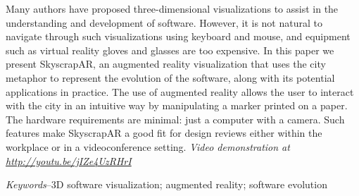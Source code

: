 Many authors have proposed three-dimensional visualizations to assist in the understanding and development of software. However, it is not natural to navigate through such visualizations using keyboard and mouse, and equipment such as virtual reality gloves and glasses are too expensive. In this paper we present SkyscrapAR, an augmented reality visualization that uses the city metaphor to represent the evolution of the software, along with its potential applications in practice. The use of augmented reality allows the user to interact with the city in an intuitive way by manipulating a marker printed on a paper. The hardware requirements are minimal: just a computer with a camera. Such features make SkyscrapAR a good fit for design reviews either within the workplace or in a videoconference setting. 
\emph{Video demonstration at \url{http://youtu.be/jIZe4UzRHrI}}

\emph{Keywords}--3D software visualization; augmented reality; software evolution
